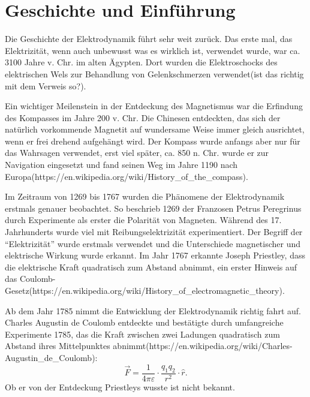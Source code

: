 %
%
%
%
\section{Geschichte und Einführung\label{maxwell:section:teil0}}
Die Geschichte der Elektrodynamik führt sehr weit zurück.
Das erste mal, das Elektrizität, wenn auch unbewusst was es wirklich ist, verwendet wurde, war ca. 3100 Jahre v. Chr. im alten Ägypten.
Dort wurden die Elektroschocks des elektrischen Wels zur Behandlung von Gelenkschmerzen verwendet\cite{maxwell:History_of_bioelectricity}(ist das richtig mit dem Verweis so?).

Ein wichtiger Meilenstein in der Entdeckung des Magnetismus war die Erfindung des Kompasses im Jahre 200 v. Chr.
Die Chinesen entdeckten, das sich der natürlich vorkommende Magnetit auf wundersame Weise immer gleich ausrichtet, wenn er frei drehend aufgehängt wird.
Der Kompass wurde anfangs aber nur für das Wahrsagen verwendet, erst viel später, ca. 850 n. Chr. wurde er zur Navigation eingesetzt und fand seinen Weg im Jahre 1190 nach Europa(https://en.wikipedia.org/wiki/History\_of\_the\_compass).

Im Zeitraum von 1269 bis 1767 wurden die Phänomene der Elektrodynamik erstmals genauer beobachtet.
So beschrieb 1269 der Franzosen Petrus Peregrinus durch Experimente als erster die Polarität von Magneten.
Während des 17. Jahrhunderts wurde viel mit Reibungselektrizität experimentiert. Der Begriff der ``Elektrizität'' wurde erstmals verwendet und die Unterschiede magnetischer und elektrische Wirkung wurde erkannt.
Im Jahr 1767 erkannte Joseph Priestley, dass die elektrische Kraft quadratisch zum Abstand abnimmt, ein erster Hinweis auf das Coulomb-Gesetz(https://en.wikipedia.org/wiki/History\_of\_electromagnetic\_theory).

Ab dem Jahr 1785 nimmt die Entwicklung der Elektrodynamik richtig fahrt auf.
Charles Augustin de Coulomb entdeckte und bestätigte durch umfangreiche Experimente 1785, das die Kraft zwischen zwei Ladungen quadratisch zum Abstand ihres Mittelpunktes abnimmt(https://en.wikipedia.org/wiki/Charles-Augustin\_de\_Coulomb):
\[
\vec{F}
=
\frac{1}{4 \pi \varepsilon}
\cdot
\frac{q_1 q_2}{r^2}
\cdot
\hat{r}.
\]
Ob er von der Entdeckung Priestleys wusste ist nicht bekannt.

